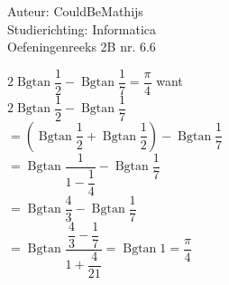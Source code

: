 \documentclass[a4paper]{article}
\newcommand{\Bgtan}{\operatorname{Bgtan}}
\begin{document}
  
\noindent \large Auteur: CouldBeMathijs \\
\noindent \large Studierichting: Informatica\\
\noindent \large Oefeningenreeks 2B nr. 6.6\\

\medskip

\normalsize

$2 \Bgtan \dfrac{1}{2} - \Bgtan \dfrac{1}{7} = \dfrac{\pi}{4}$ want\\

$2 \Bgtan \dfrac{1}{2} - \Bgtan \dfrac{1}{7}$\\

$=\left( \Bgtan \dfrac{1}{2} + \Bgtan \dfrac{1}{2} \right) -  \Bgtan \dfrac{1}{7}$\\

$=\Bgtan \dfrac{1}{1-\dfrac{1}{4}} - \Bgtan \dfrac{1}{7}$\\

$=\Bgtan \dfrac{4}{3} - \Bgtan \dfrac{1}{7}$\\

$=\Bgtan \dfrac{\dfrac{4}{3} - \dfrac{1}{7}}{1+ \dfrac{4}{21}} = \Bgtan 1 = \dfrac{\pi}{4}$


\begin{thebibliography}{999}
\end{thebibliography}
\end{document}
